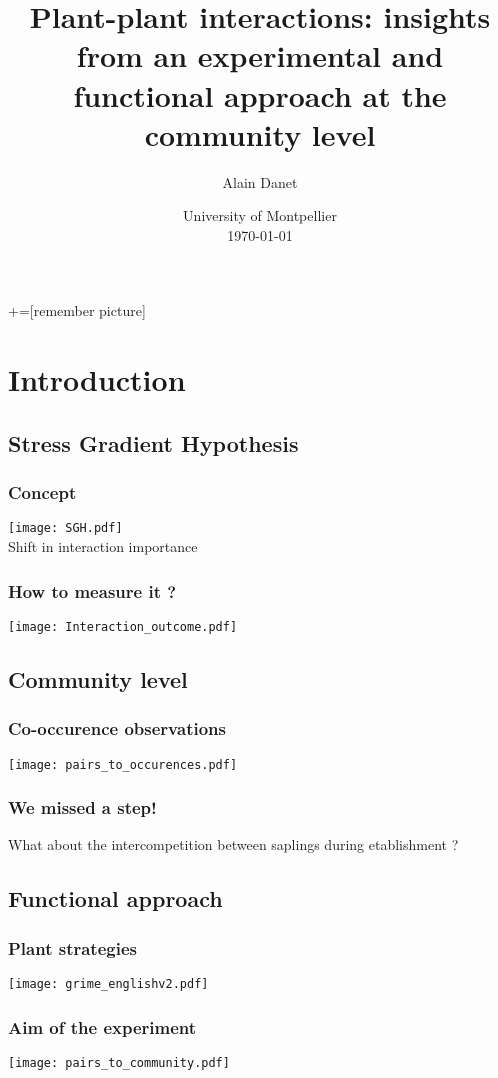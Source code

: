 \documentclass{beamer}[12pt]
\title{Plant-plant interactions: insights from an experimental and functional approach at the community level}
\author{Alain Danet}
\institute{Supervised by\\Susana Bautista \& Sonia Kefi}
\date{University of Montpellier\\ \today}
\begin{document}
   +=[remember picture]
   \everymath{\displaystyle}   
   
   \begin{frame}
\titlepage
\end{frame}

\section{Introduction}

\subsection{Stress Gradient Hypothesis}

\begin{frame}\frametitle{Concept}
\texttt{[image: SGH.pdf]} \\
\vfill
Shift in interaction importance
\end{frame}

\begin{frame}\frametitle{How to measure it ?}
	\texttt{[image: Interaction\_outcome.pdf]}
\end{frame}

\subsection{Community level}

\begin{frame}\frametitle{Co-occurence observations}
	\texttt{[image: pairs\_to\_occurences.pdf]}
\end{frame}

\begin{frame}\frametitle{We missed a step!}
 What about the intercompetition between saplings during etablishment ?
\end{frame}

\subsection{Functional approach}

\begin{frame}\frametitle{Plant strategies}
	\texttt{[image: grime\_englishv2.pdf]}
\end{frame}

\begin{frame}\frametitle{Aim of the experiment}
	\texttt{[image: pairs\_to\_community.pdf]}
\end{frame}
\end{document}
